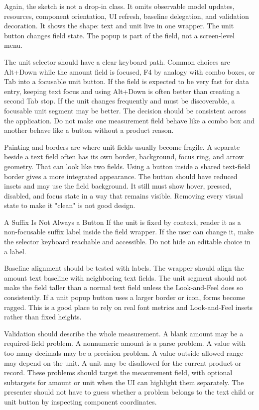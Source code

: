 Again, the sketch is not a drop-in class. It omits observable model updates, resources,
component orientation, UI refresh, baseline delegation, and validation decoration. It
shows the shape: text and unit live in one wrapper. The unit button changes field state.
The popup is part of the field, not a screen-level menu.

The unit selector should have a clear keyboard path. Common choices are Alt+Down while
the amount field is focused, F4 by analogy with combo boxes, or Tab into a focusable
unit button. If the field is expected to be very fast for data entry, keeping text focus
and using Alt+Down is often better than creating a second Tab stop. If the unit changes
frequently and must be discoverable, a focusable unit segment may be better. The
decision should be consistent across the application. Do not make one measurement field
behave like a combo box and another behave like a button without a product reason.

Painting and borders are where unit fields usually become fragile. A separate
 beside a text field often has its own border, background, focus ring,
and arrow geometry. That can look like two fields. Using a button inside a shared
text-field border gives a more integrated appearance. The button should have reduced
insets and may use the field background. It still must show hover, pressed, disabled,
and focus state in a way that remains visible. Removing every visual state to make it
"clean" is not good design.

\begin{detailbox}{A Suffix Is Not Always a Button}
If the unit is fixed by context, render it as a non-focusable suffix label inside the
field wrapper. If the user can change it, make the selector keyboard reachable and
accessible. Do not hide an editable choice in a label.
\end{detailbox}

Baseline alignment should be tested with labels. The wrapper should align the amount
text baseline with neighboring text fields. The unit segment should not make the field
taller than a normal text field unless the Look-and-Feel does so consistently. If a unit
popup button uses a larger border or icon, forms become ragged. This is a good place to
rely on real font metrics and Look-and-Feel insets rather than fixed heights.

Validation should describe the whole measurement. A blank amount may be a required-field
problem. A nonnumeric amount is a parse problem. A value with too many decimals may be a
precision problem. A value outside allowed range may depend on the unit. A unit may be
disallowed for the current product or record. These problems should target the
measurement field, with optional subtargets for amount or unit when the UI can highlight
them separately. The presenter should not have to guess whether a problem belongs to the
text child or unit button by inspecting component coordinates.

